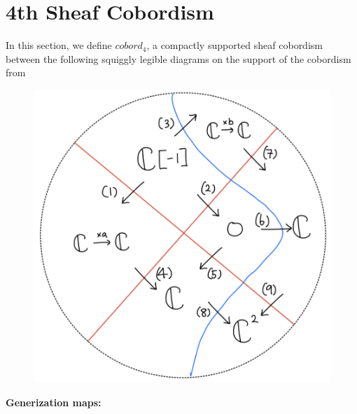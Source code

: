 \section{4th Sheaf Cobordism}
In this section, we define $cobord_4$, a compactly supported sheaf cobordism between the following squiggly legible diagrams on the support of the cobordism from
\begin{figure}[H]
    \centering
    \includegraphics[scale = 0.95]{diagrams/lemma4/21.png}
    \caption{}
    \label{fig:your-label}
\end{figure}
\textbf{Generization maps:}
